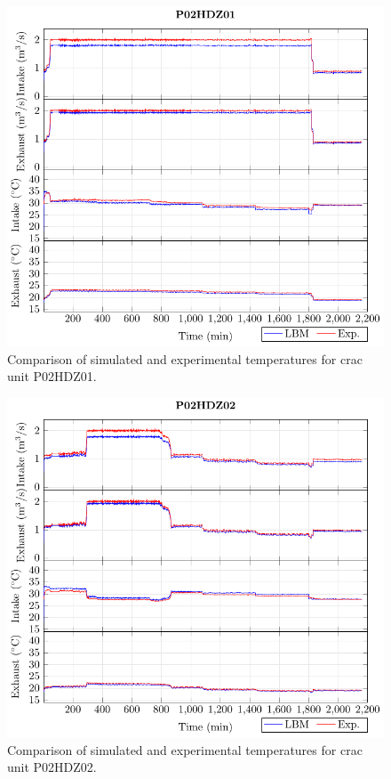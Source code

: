 \clearpage

\begin{figure}[!htb]
\centering
\includegraphics[width=\linewidth]{Plots/P02HDZ01_T.pdf}
\caption{Comparison of simulated and experimental temperatures for \gls{crac} unit P02HDZ01.}
\label{fig:P02HDZ01_plot}
\end{figure}

\clearpage

\begin{figure}[!htb]
\centering
\includegraphics[width=\linewidth]{Plots/P02HDZ02_T.pdf}
\caption{Comparison of simulated and experimental temperatures for \gls{crac} unit P02HDZ02.}
\label{fig:P02HDZ02_plot}
\end{figure}

